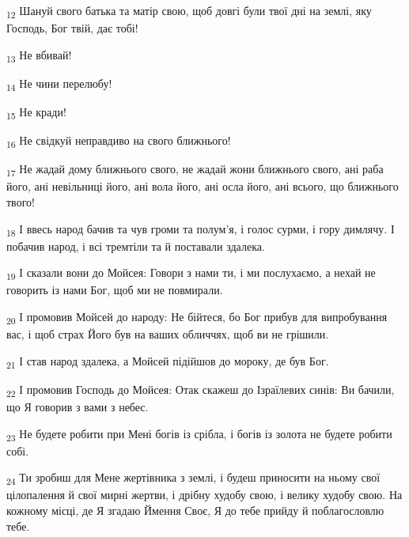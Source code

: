 \begin{tcolorbox}
\textsubscript{12} Шануй свого батька та матір свою, щоб довгі були твої дні на землі, яку Господь, Бог твій, дає тобі!
\end{tcolorbox}
\begin{tcolorbox}
\textsubscript{13} Не вбивай!
\end{tcolorbox}
\begin{tcolorbox}
\textsubscript{14} Не чини перелюбу!
\end{tcolorbox}
\begin{tcolorbox}
\textsubscript{15} Не кради!
\end{tcolorbox}
\begin{tcolorbox}
\textsubscript{16} Не свідкуй неправдиво на свого ближнього!
\end{tcolorbox}
\begin{tcolorbox}
\textsubscript{17} Не жадай дому ближнього свого, не жадай жони ближнього свого, ані раба його, ані невільниці його, ані вола його, ані осла його, ані всього, що ближнього твого!
\end{tcolorbox}
\begin{tcolorbox}
\textsubscript{18} І ввесь народ бачив та чув громи та полум'я, і голос сурми, і гору димлячу. І побачив народ, і всі тремтіли та й поставали здалека.
\end{tcolorbox}
\begin{tcolorbox}
\textsubscript{19} І сказали вони до Мойсея: Говори з нами ти, і ми послухаємо, а нехай не говорить із нами Бог, щоб ми не повмирали.
\end{tcolorbox}
\begin{tcolorbox}
\textsubscript{20} І промовив Мойсей до народу: Не бійтеся, бо Бог прибув для випробування вас, і щоб страх Його був на ваших обличчях, щоб ви не грішили.
\end{tcolorbox}
\begin{tcolorbox}
\textsubscript{21} І став народ здалека, а Мойсей підійшов до мороку, де був Бог.
\end{tcolorbox}
\begin{tcolorbox}
\textsubscript{22} І промовив Господь до Мойсея: Отак скажеш до Ізраїлевих синів: Ви бачили, що Я говорив з вами з небес.
\end{tcolorbox}
\begin{tcolorbox}
\textsubscript{23} Не будете робити при Мені богів із срібла, і богів із золота не будете робити собі.
\end{tcolorbox}
\begin{tcolorbox}
\textsubscript{24} Ти зробиш для Мене жертівника з землі, і будеш приносити на ньому свої цілопалення й свої мирні жертви, і дрібну худобу свою, і велику худобу свою. На кожному місці, де Я згадаю Ймення Своє, Я до тебе прийду й поблагословлю тебе.
\end{tcolorbox}
